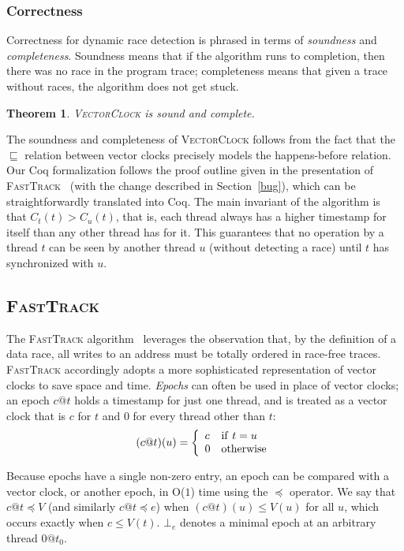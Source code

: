 \documentclass[preprint, 10pt]{sigplanconf}
\newcommand{\VCalg}{\textsc{VectorClock}\xspace}
\newcommand{\FT}{\textsc{FastTrack}\xspace}
\newcommand{\Constant}{O($1$)\xspace}
\newcommand{\EpochCompare}{\preceq}
\newtheorem{theorem}{Theorem}
\begin{document}
\subsubsection{Correctness}
Correctness for dynamic race detection is phrased in terms of \emph{soundness} and \emph{completeness}. Soundness means that if the algorithm runs to completion, then there was no race in the program trace; completeness means that given a trace without races, the algorithm does not get stuck.
\begin{theorem}\label{vc-correct}\VCalg is sound and complete.\end{theorem}
The soundness and completeness of \VCalg follows from the fact that the $\sqsubseteq$ relation between vector clocks precisely models the happens-before relation. Our Coq formalization follows the proof outline given in the presentation of \FT~\cite{fasttrack} (with the change described in Section~\ref{bug}), which can be straightforwardly translated into Coq. The main invariant of the algorithm is that $C_t(t) > C_u(t)$, that is, each thread always has a higher timestamp for itself than any other thread has for it. This guarantees that no operation by a thread $t$ can be seen by another thread $u$ (without detecting a race) until $t$ has synchronized with $u$.

\subsection{\FT}


The \FT algorithm~\cite{fasttrack} leverages the observation that, by the definition of a data race, all writes to an address must be totally ordered in race-free traces. \FT accordingly adopts a more sophisticated representation of vector clocks to save space and time.
\emph{Epochs} can often be used in place of vector clocks; an epoch $c@t$  holds a timestamp for just one thread, and is treated as a vector clock that is $c$ for $t$ and 0 for every thread other than $t$:
\[
(c@t)(u) = 
\left\{
  \begin{array}[c]{ll}
   c & \mathrm{if}\ t = u \\
   0 & \mathrm{otherwise}
  \end{array}
  \right.
\]

Because epochs have a single non-zero entry, an epoch can be compared with a vector clock, or another epoch, in \Constant time using the $\EpochCompare$ operator. We say that $c@t \EpochCompare V$ (and similarly $c@t \EpochCompare e$) when $(c@t)(u) \leq V(u)$ for all $u$, which occurs exactly when $c \le V(t)$.
$\bot_e$ denotes a minimal epoch at an arbitrary thread $0@t_0$.
\end{document}

